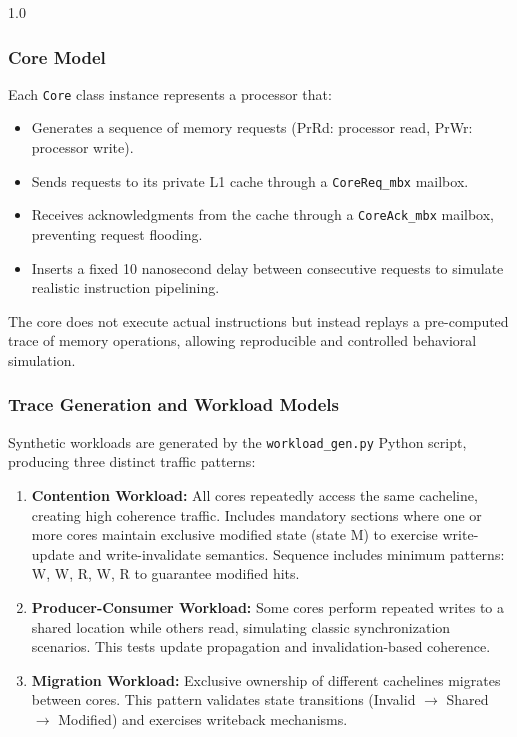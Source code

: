 \documentclass[12pt]{article}
\begin{document}
\begin{spacing}{1.0}
\subsubsection{Core Model}

Each \texttt{Core} class instance represents a processor that:

\begin{itemize}
    \item Generates a sequence of memory requests (PrRd: processor read, PrWr: processor write).
    \item Sends requests to its private L1 cache through a \texttt{CoreReq\_mbx} mailbox.
    \item Receives acknowledgments from the cache through a \texttt{CoreAck\_mbx} mailbox, preventing request flooding.
    \item Inserts a fixed 10 nanosecond delay between consecutive requests to simulate realistic instruction pipelining.
\end{itemize}

The core does not execute actual instructions but instead replays a pre-computed trace of memory operations, allowing reproducible and controlled behavioral simulation.

\subsubsection{Trace Generation and Workload Models}

Synthetic workloads are generated by the \texttt{workload\_gen.py} Python script, producing three distinct traffic patterns:

\begin{enumerate}
    \item \textbf{Contention Workload:} All cores repeatedly access the same cacheline, creating high coherence traffic. Includes mandatory sections where one or more cores maintain exclusive modified state (state M) to exercise write-update and write-invalidate semantics. Sequence includes minimum patterns: W, W, R, W, R to guarantee modified hits.
    
    \item \textbf{Producer-Consumer Workload:} Some cores perform repeated writes to a shared location while others read, simulating classic synchronization scenarios. This tests update propagation and invalidation-based coherence.
    
    \item \textbf{Migration Workload:} Exclusive ownership of different cachelines migrates between cores. This pattern validates state transitions (Invalid $\to$ Shared $\to$ Modified) and exercises writeback mechanisms.
\end{enumerate}


\end{spacing}
\end{document}
